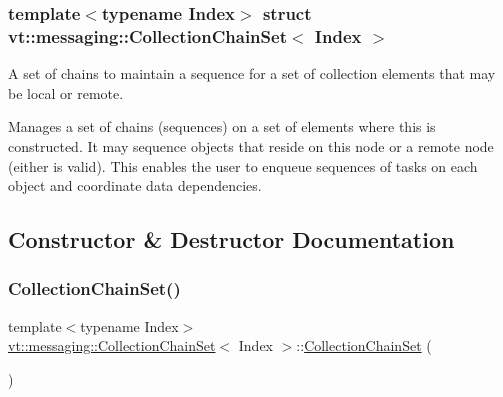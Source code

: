\subsubsection*{template$<$typename Index$>$\newline
struct vt\+::messaging\+::\+Collection\+Chain\+Set$<$ Index $>$}

A set of chains to maintain a sequence for a set of collection elements that may be local or remote. 

Manages a set of chains (sequences) on a set of elements where this is constructed. It may sequence objects that reside on this node or a remote node (either is valid). This enables the user to enqueue sequences of tasks on each object and coordinate data dependencies. 

\subsection{Constructor \& Destructor Documentation}
\mbox{\label{classvt_1_1messaging_1_1_collection_chain_set_aeb43ad4a2e46ea059817b639b72ddb3b}} 
\subsubsection{\texorpdfstring{Collection\+Chain\+Set()}{CollectionChainSet()}\hspace{0.1cm}{\footnotesize\ttfamily [1/4]}}
{\footnotesize\ttfamily template$<$typename Index$>$ \\
\hyperlink{classvt_1_1messaging_1_1_collection_chain_set}{vt\+::messaging\+::\+Collection\+Chain\+Set}$<$ Index $>$\+::\hyperlink{classvt_1_1messaging_1_1_collection_chain_set}{Collection\+Chain\+Set} (\begin{DoxyParamCaption}{ }\end{DoxyParamCaption})\hspace{0.3cm}{\ttfamily [default]}}

\mbox{\label{classvt_1_1messaging_1_1_collection_chain_set_a71328cb5c03210ffdb0bd5dd5f3b6797}} 
